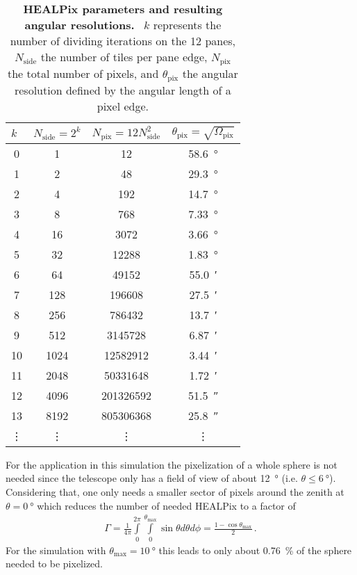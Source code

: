 \begin{table}[h]
\centering
\begin{tabular}{S[table-format=2.0]|S[table-format=4.0]|S[table-format=9.0]|S[table-format=2.2]}
 &  &  &  \\
  & 1    & 12        &  \SI{58.6}{\degree}\\
1  & 2    & 48        &  \SI{29.3}{\degree}\\
2  & 4    & 192       &  \SI{14.7}{\degree}\\
3  & 8    & 768 	  &  \SI{7.33}{\degree}\\
4  & 16   & 3072      &  \SI{3.66}{\degree}\\
5  & 32   & 12288     &  \SI{1.83}{\degree}\\
6  & 64   & 49152     &  \SI{55.0}{\arcminute}\\
7  & 128  & 196608    &  \SI{27.5}{\arcminute}\\
8  & 256  & 786432    &  \SI{13.7}{\arcminute}\\
9  & 512  & 3145728   &  \SI{6.87}{\arcminute}\\
10 & 1024 & 12582912  &  \SI{3.44}{\arcminute}\\
11 & 2048 & 50331648  &  \SI{1.72}{\arcminute}\\
12 & 4096 & 201326592 &  \SI{51.5}{\arcsecond}\\
13 & 8192 & 805306368 &  \SI{25.8}{\arcsecond}\\
 &  &  &  \\
\end{tabular}
\caption[HEALPix parameters and resulting angular resolutions]{\textbf{HEALPix parameters and resulting angular resolutions.}~\cite{healpix:paper} $k$ represents the number of dividing iterations on the 12 panes, $N_\text{side}$ the number of tiles per pane edge, $N_\text{pix}$ the total number of pixels, and $\theta_\text{pix}$ the angular resolution defined by the angular length of a pixel edge.}
\label{healpix:table}
\end{table}

For the application in this simulation the pixelization of a whole sphere is not needed since the telescope only has a field of view of about \SI{12}{\degree} (i.e. $\theta \leq \SI{6}{\degree}$). Considering that, one only needs a smaller sector of pixels around the zenith at $\theta = \SI{0}{\degree}$ which reduces the number of needed HEALPix to a factor of
\begin{align}
	\Gamma = \frac{1}{4\pi}\int\limits_{0}^{2\pi}\int\limits_{0}^{\theta_\text{max}}\sin{\theta} d\theta d\phi = \frac{1-\cos\theta_\text{max}}{2}\,.
	\label{eq:spherefactor}
\end{align}
For the \iceact simulation with $\theta_\text{max} = \SI{10}{\degree}$ this leads to only about \SI{0.76}{\percent} of the sphere needed to be pixelized.

